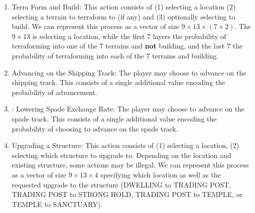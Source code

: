 \documentclass[10pt,twocolumn,letterpaper]{article}
\begin{document}
\begin{enumerate}
    \item Terra Form and Build: This action consists of (1) selecting a location (2) selecting a terrain to terraform to (if any) and (3) optionally selecting to build.  We can represent this process as a vector of size $9 \times 13 \times (7\times 2)$. The $9 \times 13$ is selecting a location, while the first $7$ layers the probability of terraforming into one of the $7$ terrains and \textbf{not} building, and the last $7$ the probability of terraforming into each of the $7$ terrains and building.
    \item Advancing on the Shipping Track: The player may choose to advance on the shipping track. This consists of a single additional value encoding the probability of advancement.
    \item: Lowering Spade Exchange Rate: The player may choose to advance on the spade track. This consists of a single additional value encoding the probability of choosing to advance on the spade track.
    \item Upgrading a Structure: This action consists of (1) selecting a location, (2) selecting which structure to upgrade to. Depending on the location and existing structure, some actions may be illegal. We can represent this process as a vector of size $9 \times 13 \times 4$ specifying which location as well as the requested upgrade to the structure (DWELLING to TRADING POST, TRADING POST to STRONG HOLD, TRADING POST to TEMPLE, or TEMPLE to SANCTUARY).
    

\end{enumerate}
\end{document}
